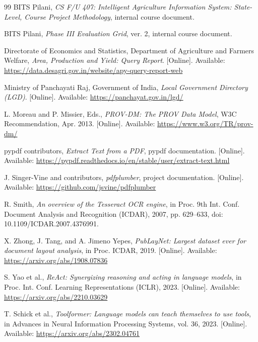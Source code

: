 \begingroup
\small
\raggedright
\setlength{\parskip}{0pt}
\begin{thebibliography}{99}
\setlength{\itemsep}{1.5pt}
\setlength{\parsep}{0pt}
 BITS Pilani, \emph{CS F/U 407: Intelligent Agriculture Information System: State-Level, Course Project Methodology}, internal course document.

 BITS Pilani, \emph{Phase III Evaluation Grid}, ver. 2, internal course document.

 Directorate of Economics and Statistics, Department of Agriculture and Farmers Welfare, \emph{Area, Production and Yield: Query Report}. [Online]. Available: \url{https://data.desagri.gov.in/website/apy-query-report-web}

 Ministry of Panchayati Raj, Government of India, \emph{Local Government Directory (LGD)}. [Online]. Available: \url{https://panchayat.gov.in/lgd/}

 L. Moreau and P. Missier, Eds., \emph{PROV-DM: The PROV Data Model}, W3C Recommendation, Apr. 2013. [Online]. Available: \url{https://www.w3.org/TR/prov-dm/}

 pypdf contributors, \emph{Extract Text from a PDF}, pypdf documentation. [Online]. Available: \url{https://pypdf.readthedocs.io/en/stable/user/extract-text.html}

 J. Singer-Vine and contributors, \emph{pdfplumber}, project documentation. [Online]. Available: \url{https://github.com/jsvine/pdfplumber}

 R. Smith, \emph{An overview of the Tesseract OCR engine}, in Proc. 9th Int. Conf. Document Analysis and Recognition (ICDAR), 2007, pp. 629--633, doi: 10.1109/ICDAR.2007.4376991.

 X. Zhong, J. Tang, and A. Jimeno Yepes, \emph{PubLayNet: Largest dataset ever for document layout analysis}, in Proc. ICDAR, 2019. [Online]. Available: \url{https://arxiv.org/abs/1908.07836}

 S. Yao et al., \emph{ReAct: Synergizing reasoning and acting in language models}, in Proc. Int. Conf. Learning Representations (ICLR), 2023. [Online]. Available: \url{https://arxiv.org/abs/2210.03629}

 T. Schick et al., \emph{Toolformer: Language models can teach themselves to use tools}, in Advances in Neural Information Processing Systems, vol. 36, 2023. [Online]. Available: \url{https://arxiv.org/abs/2302.04761}


\end{thebibliography}

